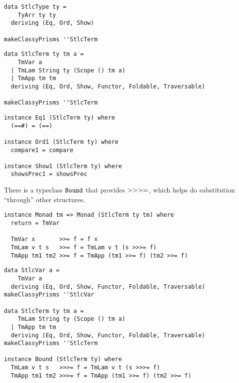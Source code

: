 \documentclass[aspectration=169]{beamer}
\begin{document}
\begin{frame}[fragile]
  \begin{verbatim}
data StlcType ty =
    TyArr ty ty
  deriving (Eq, Ord, Show)

makeClassyPrisms ''StlcTerm
  \end{verbatim}  
\end{frame}

\begin{frame}[fragile]
  \begin{verbatim}
data StlcTerm ty tm a =
    TmVar a
  | TmLam String ty (Scope () tm a)
  | TmApp tm tm
  deriving (Eq, Ord, Show, Functor, Foldable, Traversable)

makeClassyPrisms ''StlcTerm
  \end{verbatim}  
\end{frame}

\begin{frame}[fragile]
  \begin{verbatim}
instance Eq1 (StlcTerm ty) where
  (==#) = (==)

instance Ord1 (StlcTerm ty) where
  compare1 = compare

instance Show1 (StlcTerm ty) where
  showsPrec1 = showsPrec
  \end{verbatim}  
\end{frame}

\begin{frame}[c]
  \begin{center}
  There is a typeclass $\tt{Bound}$ that provides $\tt{>>>=}$, which helps do
  substitution ``through'' other structures.
  \end{center}
\end{frame}

\begin{frame}[fragile]
  \begin{verbatim}
instance Monad tm => Monad (StlcTerm ty tm) where
  return = TmVar 

  TmVar x       >>= f = f x
  TmLam v t s   >>= f = TmLam v t (s >>>= f)
  TmApp tm1 tm2 >>= f = TmApp (tm1 >>= f) (tm2 >>= f)
  \end{verbatim}  
\end{frame}

\begin{frame}[fragile]
  \begin{verbatim}
data StlcVar a =
    TmVar a
  deriving (Eq, Ord, Show, Functor, Foldable, Traversable)
makeClassyPrisms ''StlcVar

data StlcTerm ty tm a =
    TmLam String ty (Scope () tm a)
  | TmApp tm tm
  deriving (Eq, Ord, Show, Functor, Foldable, Traversable)
makeClassyPrisms ''StlcTerm

instance Bound (StlcTerm ty) where
  TmLam v t s   >>>= f = TmLam v t (s >>>= f)
  TmApp tm1 tm2 >>>= f = TmApp (tm1 >>= f) (tm2 >>= f)
  \end{verbatim}  
\end{frame}
\end{document}
